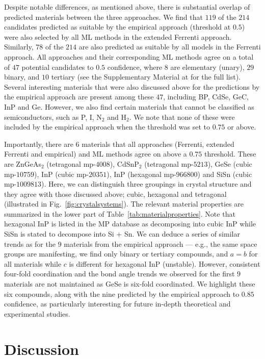 \documentclass[superscriptaddress,unsortedaddress,
 amsmath,amssymb,
 aps,
]{revtex4-2}
\begin{document}
Despite notable differences, as mentioned above, there is substantial overlap of predicted materials between the three approaches. 
We find that $119$ of the $214$ candidates predicted as suitable by the empirical approach (threshold at $0.5$) were also selected by all ML methods in the extended Ferrenti approach. 
Similarly, $78$ of the $214$ are also predicted as suitable by all models in the Ferrenti approach. All approaches and their corresponding ML methods agree on a total of $47$ potential candidates to $0.5$ confidence, where $8$ are elementary (unary), $29$ binary, and $10$ tertiary  
(see the Supplementary Material at \cite{supplementary} for the full list). 
Several interesting materials that were also discussed above for the predictions by the empirical approach are present among these $47$, including BP, CdSe, GeC, InP and Ge. However, we also find certain materials that cannot be classified as semiconductors, such as P, I, N$_2$ and H$_2$. We note that none of these were included by the empirical approach when the threshold was set to $0.75$ or above. 

Importantly, there are $6$ materials that all approaches (Ferrenti, extended Ferrenti and empirical) and ML methods agree on above a $0.75$ threshold. These are ZnGeAs$_2$ (tetragonal mp-$4008$), CdSnP$_2$ (tetragonal mp-$5213$), GeSe (cubic mp-$10759$), InP (cubic mp-$20351$), InP (hexagonal mp-$966800$) and SiSn (cubic mp-$1009813$). Here, we can distinguish three groupings in crystal structure and they agree with those discussed above; cubic, hexagonal and tetragonal (illustrated in Fig.~\ref{fig:crystalsystems}). The relevant material properties are summarized in the lower part of Table~\ref{tab:materialproperties}. 
Note that hexagonal InP is listed in the MP database as decomposing into cubic InP while SiSn is stated to decompose into Si $+$ Sn. 
We can deduce a series of similar trends as for the $9$ materials from the empirical approach --- e.g., the same space groups are manifesting, we find only binary or tertiary compounds, and $a=b$ for all materials while $c$ is different for hexagonal InP (unstable). However, consistent four-fold coordination and the bond angle trends we observed for the first $9$ materials are not maintained as GeSe is six-fold coordinated. 
We highlight these six compounds, along with the nine predicted by the empirical approach to $0.85$ confidence, as particularly interesting for future in-depth theoretical and experimental studies. 

\section*{Discussion}
\end{document}
